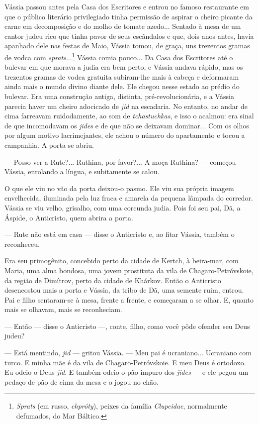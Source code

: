 Vássia passou antes pela Casa dos Escritores e entrou no famoso
restaurante em que o público literário privilegiado tinha permissão de
aspirar o cheiro picante da carne em decomposição e do molho de tomate
azedo... Sentado à mesa de um cantor judeu rico que tinha pavor de seus
escândalos e que, dois anos antes, havia apanhado dele nas festas de
Maio, Vássia tomou, de graça, uns trezentos gramas de vodca com
\emph{sprats}...\footnote{\emph{Sprats} (em russo, \emph{chpróty}),
  peixes da família \emph{Clupeidae}, normalmente defumados, do Mar
  Báltico.} Vássia comia pouco... Da Casa dos Escritores até o bulevar
em que morava a judia era bem perto, e Vássia andava rápido, mas os
trezentos gramas de vodca gratuita subiram-lhe mais à cabeça e
deformaram ainda mais o mundo divino diante dele. Ele chegou nesse
estado ao prédio do bulevar. Era uma construção antiga, distinta,
pré-revolucionária, e a Vássia parecia haver um cheiro adocicado de
\emph{jid} na escadaria. No entanto, no andar de cima farreavam
ruidodamente, ao som de \emph{tchastuchkas}, e isso o acalmou: era sinal
de que incomodavam os \emph{jides} e de que não se deixavam dominar...
Com os olhos por algum motivo lacrimejantes, ele achou o número do
apartamento e tocou a campanhia. A porta se abriu.

--- Posso ver a Rute?... Ruthina, por favor?... A moça Ruthina? ---
começou Vássia, enrolando a língua, e subitamente se calou.

O que ele viu no vão da porta deixou-o pasmo. Ele viu sua própria imagem
envelhecida, iluminada pela luz fraca e amarela da pequena lâmpada do
corredor. Vássia se viu velho, grisalho, com uma corcunda judia. Pois
foi seu pai, Dã, a Áspide, o Anticristo, quem abrira a porta.

--- Rute não está em casa --- disse o Anticristo e, ao fitar Vássia,
também o reconheceu.

Era seu primogênito, concebido perto da cidade de Kertch, à beira-mar,
com Maria, uma alma bondosa, uma jovem prostituta da vila de
Chagaro-Petróvskoie, da região de Dimítrov, perto da cidade de Khárkov.
Então o Anticristo desencostou mais a porta e Vássia, da tribo de Dã,
uma semente ruim, entrou. Pai e filho sentaram-se à mesa, frente a
frente, e começaram a se olhar. E, quanto mais se olhavam, mais se
reconheciam.

--- Então --- disse o Anticristo ---, conte, filho, como você pôde
ofender seu Deus judeu?

--- Está mentindo, \emph{jid} --- gritou Vássia. --- Meu pai é
ucraniano... Ucraniano com turco. E minha mãe é da vila de
Chagaro-Petróvskoie. E meu Deus é ortodoxo. Eu odeio o Deus \emph{jid}.
E também odeio o pão impuro dos \emph{jides} --- e ele pegou um pedaço
de pão de cima da mesa e o jogou no chão.

